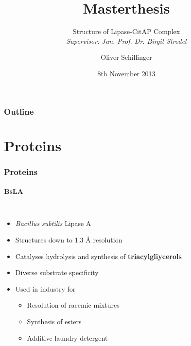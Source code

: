 \documentclass[english]{beamer}
\title[Masterthesis]{Masterthesis}
\subtitle[Structure]{Structure of Lipase-CitAP Complex\\
\textit{\small Supervisor: Jun.-Prof. Dr. Birgit Strodel}}
\author{Oliver Schillinger}
\institute{ICS-6 | Multiscale Modelling Group}
\date{8th November 2013}
\begin{document}
\maketitle

\begin{frame}
    \frametitle{Outline}
    \tableofcontents
\end{frame}


\section{Proteins}


\begin{frame}
    \frametitle{Proteins}
    \framesubtitle{BsLA}

    \begin{columns}[t]
        \begin{itemize}
            \item \textit{Bacillus subtilis} Lipase A
            \item Structures down to 1.3 \r{A} resolution
            \item Catalyses hydrolysis and synthesis of \textbf{triacylgliycerols}
            \item Diverse substrate specificity
            \item Used in industry for
                \begin{itemize}
                    \item Resolution of racemic mixtures
                    \item Synthesis of esters
                    \item Additive laundry detergent
                \end{itemize}
        \end{itemize} 


\end{columns}
\end{frame}
\end{document}
